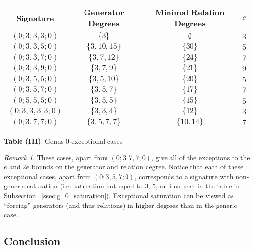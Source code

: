 \documentclass{amsart}
\theoremstyle{plain}
\theoremstyle{definition}
\theoremstyle{remark}
\newtheorem{rem}[thm]{Remark}
\numberwithin{equation}{section}
\newcommand\ssec{\subsection}
\begin{document}
\begin{longtable}
	{| c || c | c | c |}
	\hline
	Signature & Generator Degrees & Minimal Relation Degrees & $e$ \\
	\hline
	\hline

	$(0; 3, 3, 3; 0)$ & $\{3\}$ & $\emptyset$ & $3$ \\	\hline

	$(0; 3, 3, 5; 0)$ & $\{3, 10, 15\}$ & $\{30\}$ & $5$ \\	\hline
	
	$(0; 3, 3, 7; 0)$ & $\{3, 7, 12\}$ & $\{24\}$ & $7$ \\	\hline
	
	$(0; 3, 3, 9; 0)$ & $\{3, 7, 9\}$ & $\{21\}$ & $9$ \\	\hline
	
	$(0; 3, 5, 5; 0)$ & $\{3, 5, 10\}$ & $\{20\}$ & $5$ \\	\hline
	
	$(0; 3, 5, 7; 0)$ & $\{3, 5, 7\}$ & $\{17\}$ & $7$ \\	\hline
	
	$(0; 5, 5, 5; 0)$ & $\{3, 5, 5\}$ & $\{15\}$ & $5$ \\	\hline
	
	$(0; 3, 3, 3, 3; 0)$ & $\{3, 3, 4\}$ & $\{12\}$ & $3$ \\	\hline

	\hline
	
	$(0; 3, 7, 7; 0)$ & $\{3, 5, 7, 7\}$ & $\{10, 14\}$ & $7$ \\	\hline
\end{longtable}

\begin{center}
\textbf{Table (III)}: Genus 0 exceptional cases
\end{center}

\begin{rem}
These cases, apart from $(0; 3, 7, 7; 0)$, give all of the
exceptions to the $e$ and $2e$ bounds on the generator and relation
degree. Notice that each of these exceptional cases, apart from
$(0; 3, 5, 7; 0)$, corresponds to a signature with non-generic
saturation (i.e. saturation not equal to 3, 5, or 9 as seen
in the table in Subsection ~\ref{ssec:g_0_saturation}). Exceptional
saturation can be viewed as ``forcing'' generators (and thus
relations) in higher degrees than in the generic case.
\end{rem}


\ssec{Conclusion}
\label{ssec:g_0_conclusion}
\end{document}
